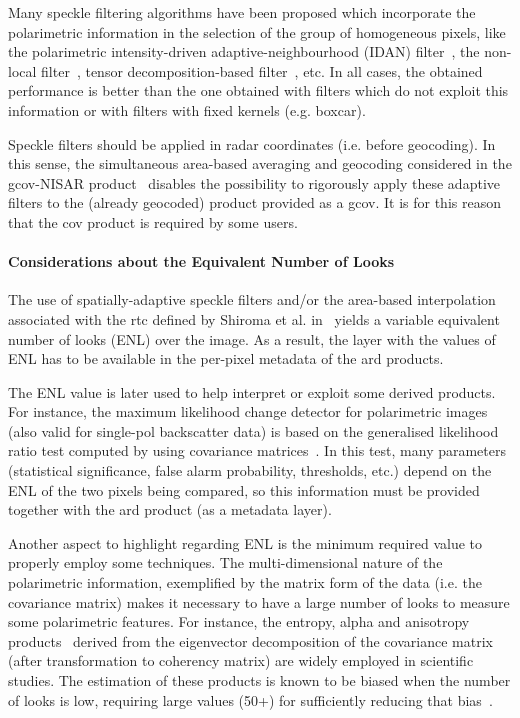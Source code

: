 Many speckle filtering algorithms have been proposed which incorporate the polarimetric information in the selection of the group of homogeneous pixels, like the polarimetric intensity-driven adaptive-neighbourhood (IDAN) filter~\cite{Vasile2006}, the non-local filter~\cite{Deledalle2015}, tensor decomposition-based filter~\cite{Luo2023}, etc.
In all cases, the obtained performance is better than the one obtained with filters which do not exploit this information or with filters with fixed kernels (e.g. boxcar).

Speckle filters should be applied in radar coordinates (i.e. before geocoding). In this sense, the simultaneous area-based averaging and geocoding considered in the \acs{gcov}-NISAR product~\cite{NISAR_GCOV_ProdSpec} disables the possibility to rigorously apply these adaptive filters to the (already geocoded) product provided as a \acs{gcov}. It is for this reason that the \acs{cov} product is required by some users.


\paragraph*{Considerations about the Equivalent Number of Looks}

The use of spatially-adaptive speckle filters and/or the area-based interpolation associated with the \acs{rtc} defined by Shiroma et al. in~\cite{Shiroma2022} yields a variable equivalent number of looks (ENL) over the image. As a result, the layer with the values of ENL has to be available in the per-pixel metadata of the \acs{ard} products.

The ENL value is later used to help interpret or exploit some derived products. For instance, the maximum likelihood change detector for polarimetric images (also valid for single-pol backscatter data) is based on the generalised likelihood ratio test computed by using covariance matrices~\cite{Conradsen2003, Nielsen2015}. In this test, many parameters (statistical significance, false alarm probability, thresholds, etc.) depend on the ENL of the two pixels being compared, so this information must be provided together with the \acs{ard} product (as a metadata layer).

Another aspect to highlight regarding ENL is the minimum required value to properly employ some techniques. The multi-dimensional nature of the polarimetric information, exemplified by the matrix form of the data (i.e. the covariance matrix) makes it necessary to have a large number of looks to measure some polarimetric features. For instance, the entropy, alpha and anisotropy products~\cite{Cloude1997, Lee_Pottier2009} derived from the eigenvector decomposition of the covariance matrix (after transformation to coherency matrix) are widely employed in scientific studies. The estimation of these products is known to be biased when the number of looks is low, requiring large values (50+) for sufficiently reducing that bias~\cite{LopezMartinez2005, Lee2008}.

